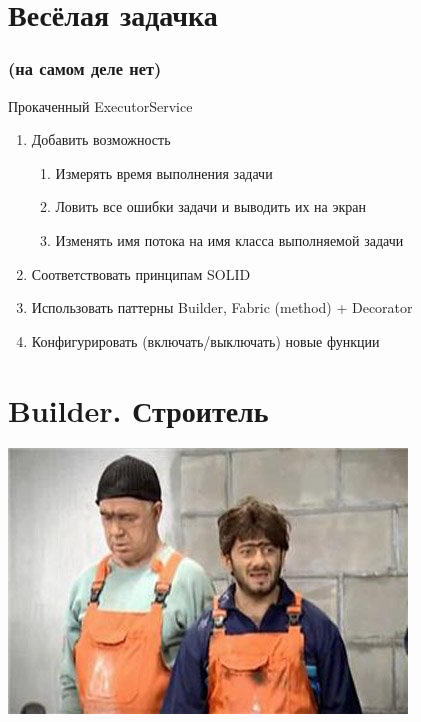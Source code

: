 \documentclass[russian,aspectratio=169,14pt]{beamer}
\begin{document}
\section*{Весёлая задачка}

\begin{frame}
    \frametitle{(на самом деле нет)}
    Прокаченный ExecutorService
    \vfill
    \begin{enumerate}
    	\item Добавить возможность
    	\begin{enumerate}
    		\item Измерять время выполнения задачи
    		\pause
       		\item Ловить все ошибки задачи и выводить их на экран
       		\pause
    		\item Изменять имя потока на имя класса выполняемой задачи
    	\end{enumerate}
    	\pause
    	\item Соответствовать принципам SOLID
    	\pause
    	\item Использовать паттерны Builder, Fabric (method) + Decorator
    	\pause
    	\item Конфигурировать (включать/выключать) новые функции
    \end{enumerate}
\end{frame}




\section{Builder. Строитель}

\begin{frame}
    \begin{center}
	\includegraphics[height=0.8\textheight]{builder.jpg}
	\end{center}
\end{frame}
\end{document}
